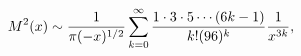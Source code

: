 \[{\mathop{M\/}\nolimits^{2}}\!\left(x\right)\sim\frac{1}{\pi(-x)^{1/2}}\sum_{k=%
0}^{\infty}\frac{1\cdot 3\cdot 5\cdots(6k-1)}{k!(96)^{k}}\frac{1}{x^{3k}},\]